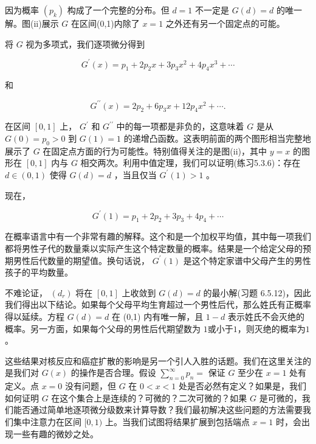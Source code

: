 因为概率 \(\left( {p}_{k}\right)\) 构成了一个完整的分布。但 \(d = 1\) 不一定是 \(G\left( d\right)  = d\) 的唯一解。图(ii)展示 \(G\) 在区间(0,1)内除了 \(x = 1\) 之外还有另一个固定点的可能。

将 \(G\) 视为多项式，我们逐项微分得到

\[
{G}^{\prime }\left( x\right)  = {p}_{1} + 2{p}_{2}x + 3{p}_{3}{x}^{2} + 4{p}_{4}{x}^{3} + \cdots
\]

和

\[
{G}^{\prime \prime }\left( x\right)  = 2{p}_{2} + 6{p}_{3}x + {12}{p}_{4}{x}^{2} + \cdots .
\]

在区间 \(\left\lbrack  {0,1}\right\rbrack\) 上， \({G}^{\prime }\) 和 \({G}^{\prime \prime }\) 中的每一项都是非负的，这意味着 \(G\) 是从 \(G\left( 0\right)  = {p}_{0} > 0\) 到 \(G\left( 1\right)  = 1\) 的递增凸函数。这表明前面的两个图形相当完整地展示了 \(G\) 在固定点方面的行为可能性。特别值得关注的是图(ii)，其中 \(y = x\) 的图形在 \(\left\lbrack  {0,1}\right\rbrack\) 内与 \(G\) 相交两次。利用中值定理，我们可以证明(练习5.3.6)：存在 \(d \in  \left( {0,1}\right)\) 使得 \(G\left( d\right)  = d\) ，当且仅当 \({G}^{\prime }\left( 1\right)  > 1\) 。

现在，

\[
{G}^{\prime }\left( 1\right)  = {p}_{1} + 2{p}_{2} + 3{p}_{3} + 4{p}_{4} + \cdots
\]

在概率语言中有一个非常有趣的解释。这个和是一个加权平均值，其中每一项我们都将男性子代的数量乘以实际产生这个特定数量的概率。结果是一个给定父母的预期男性后代数量的期望值。换句话说， \({G}^{\prime }\left( 1\right)\) 是这个特定家谱中父母产生的男性孩子的平均数量。

不难论证， \(\left( {d}_{r}\right)\) 将在 \(\left\lbrack  {0,1}\right\rbrack\) 上收敛到 \(G\left( d\right)  = d\) 的最小解(习题 6.5.12)，因此我们得出以下结论。如果每个父母平均生育超过一个男性后代，那么姓氏有正概率得以延续。方程 \(G\left( d\right)  = d\) 在 (0,1) 内有唯一解，且 \(1 - d\) 表示姓氏不会灭绝的概率。另一方面，如果每个父母的男性后代期望数为 $1$或小于$1$，则灭绝的概率为$1$。

这些结果对核反应和癌症扩散的影响是另一个引人入胜的话题。我们在这里关注的是我们对 \(G\left( x\right)\) 的操作是否合理。假设 \(\mathop{\sum }\limits_{{n = 0}}^{\infty }{p}_{n} =\) 保证 \(G\) 至少在 \(x = 1\) 处有定义。点 \(x = 0\) 没有问题，但 \(G\) 在 \(0 < x < 1\) 处是否必然有定义？如果是，我们如何证明 \(G\) 在这个集合上是连续的？可微的？二次可微的？如果 \(G\) 是可微的，我们能否通过简单地逐项微分级数来计算导数？我们最初解决这些问题的方法需要我们集中注意力在区间 \(\lbrack 0,1)\) 上。当我们试图将结果扩展到包括端点 \(x = 1\) 时，会出现一些有趣的微妙之处。

